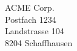 \documentclass[unibelabel]{scrlttr2}
\begin{document}
 
\begin{letter}{%
    ACME Corp.\\
	Postfach 1234\\
	Landstrasse 104\\
	8204 Schaffhausen} %
\opening{}
\end{letter}
\end{document}
